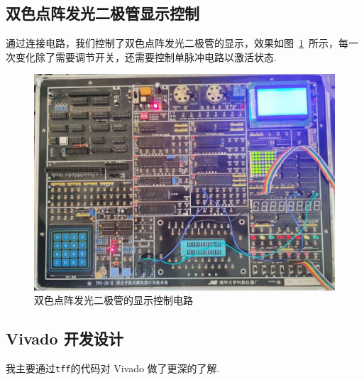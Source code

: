 \documentclass[11pt]{SEU-Digital-Report}
\begin{document}
        \subsection{双色点阵发光二极管显示控制}

            通过连接电路，我们控制了双色点阵发光二极管的显示，效果如图~\ref{fig:LEDs}~所示，每一次变化除了需要调节开关，还需要控制单脉冲电路以激活状态.

            \begin{figure}[htbp]
                \centering
                \includegraphics[width=.6\linewidth]{fig/LEDs.jpg}
                \caption{双色点阵发光二极管的显示控制电路}
                \label{fig:LEDs}
            \end{figure}

        \subsection{Vivado 开发设计}\label{subsec:vivado_improvement}

            我主要通过\texttt{tff}\cite{github:fpga-verilog}的代码对 Vivado 做了更深的了解.
\end{document}
